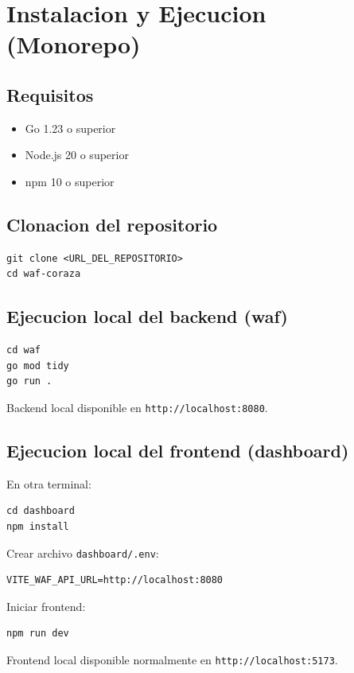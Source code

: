 \documentclass[12pt,a4paper]{article}
\begin{document}
\section{Instalacion y Ejecucion (Monorepo)}
\subsection{Requisitos}
\begin{itemize}
  \item Go 1.23 o superior
  \item Node.js 20 o superior
  \item npm 10 o superior
\end{itemize}

\subsection{Clonacion del repositorio}
\begin{lstlisting}
git clone <URL_DEL_REPOSITORIO>
cd waf-coraza
\end{lstlisting}

\subsection{Ejecucion local del backend (waf)}
\begin{lstlisting}
cd waf
go mod tidy
go run .
\end{lstlisting}

Backend local disponible en \texttt{http://localhost:8080}.

\subsection{Ejecucion local del frontend (dashboard)}
En otra terminal:

\begin{lstlisting}
cd dashboard
npm install
\end{lstlisting}

Crear archivo \texttt{dashboard/.env}:
\begin{lstlisting}
VITE_WAF_API_URL=http://localhost:8080
\end{lstlisting}

Iniciar frontend:
\begin{lstlisting}
npm run dev
\end{lstlisting}

Frontend local disponible normalmente en \texttt{http://localhost:5173}.
\end{document}
